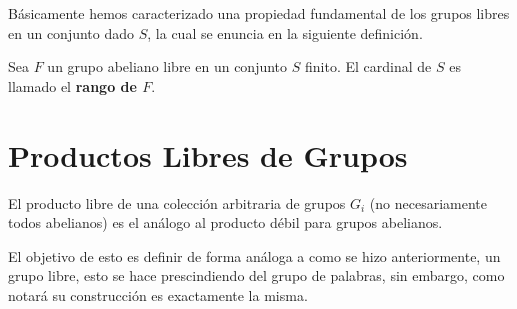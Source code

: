 \documentclass[12pt]{report}
\theoremstyle{largebreak}
\begin{document}
    Básicamente hemos caracterizado una propiedad fundamental de los grupos libres en un conjunto dado $S$, la cual se enuncia en la siguiente definición.

    \begin{mydef}
        Sea $F$ un grupo abeliano libre en un conjunto $S$ finito. El cardinal de $S$ es llamado el \textbf{rango de $F$}.
    \end{mydef}

    \section{Productos Libres de Grupos}

    El producto libre de una colección arbitraria de grupos $G_i$ (no necesariamente todos abelianos) es el análogo al producto débil para grupos abelianos.

    El objetivo de esto es definir de forma análoga a como se hizo anteriormente, un grupo libre, esto se hace prescindiendo del grupo de palabras, sin embargo, como notará su construcción es exactamente la misma.
\end{document}
